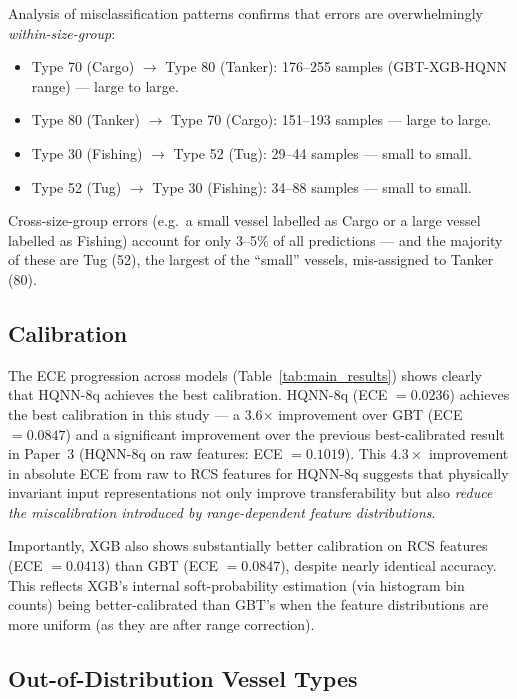 \documentclass[journal]{IEEEtran}
\begin{document}
Analysis of misclassification patterns confirms that errors are
overwhelmingly \emph{within-size-group}:
\begin{itemize}
  \item Type 70 (Cargo) $\to$ Type 80 (Tanker): 176--255 samples (GBT-XGB-HQNN range) — large to large.
  \item Type 80 (Tanker) $\to$ Type 70 (Cargo): 151--193 samples — large to large.
  \item Type 30 (Fishing) $\to$ Type 52 (Tug): 29--44 samples — small to small.
  \item Type 52 (Tug) $\to$ Type 30 (Fishing): 34--88 samples — small to small.
\end{itemize}
Cross-size-group errors (e.g.\ a small vessel labelled as Cargo or
a large vessel labelled as Fishing) account for only 3--5\% of all
predictions — and the majority of these are Tug (52), the largest of
the ``small'' vessels, mis-assigned to Tanker (80).

\subsection{Calibration}
\label{sec:calibration}

The ECE progression across models (Table~\ref{tab:main_results})
shows clearly that HQNN-8q achieves the best calibration. HQNN-8q (ECE $= 0.0236$)
achieves the best calibration in this study — a 3.6$\times$ improvement
over GBT (ECE $= 0.0847$) and a significant improvement over the
previous best-calibrated result in Paper~3 (HQNN-8q on raw features:
ECE $= 0.1019$). This $4.3\times$ improvement in absolute ECE
from raw to RCS features for HQNN-8q suggests that physically invariant
input representations not only improve transferability but also
\emph{reduce the miscalibration introduced by range-dependent feature
distributions}.

Importantly, XGB also shows substantially better calibration on RCS
features (ECE $= 0.0413$) than GBT (ECE $= 0.0847$), despite nearly
identical accuracy. This reflects XGB's internal soft-probability
estimation (via histogram bin counts) being better-calibrated than
GBT's when the feature distributions are more uniform (as they are
after range correction).

\subsection{Out-of-Distribution Vessel Types}
\label{sec:ood}
\end{document}
